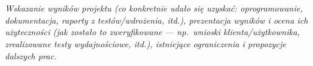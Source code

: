 \documentclass[polish,12pt]{aghthesis}
\begin{document}
\section{\SectionTitleResults}
\label{sec:wyniki-projektu}
\emph{Wskazanie wyników projektu (co konkretnie udało się uzyskać:
  oprogramowanie, dokumentacja, raporty z testów/wdrożenia, itd.), prezentacja wyników
  i ocena ich użyteczności (jak zostało to zweryfikowane --- np.\ wnioski
  klienta/użytkownika, zrealizowane testy wydajnościowe, itd.),
  istniejące ograniczenia i propozycje dalszych prac.}

\clearpage


\end{document}
